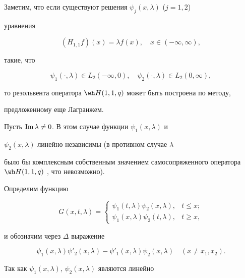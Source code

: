  


Заметим, что если существуют решения $\psi_j(x,\lambda)$ ($j=1,2$) 


уравнения 


$$ 


(H_{1,1}f)(x)=\lambda f(x),\quad x\in(-\infty,\infty), 


$$ 


такие, что 


$$ 


\psi_1(\cdot,\lambda)\in L_2(-\infty,0),\quad 


\psi_2(\cdot,\lambda)\in L_2(0,\infty), 


$$ 


то резольвента оператора $\wh H(1,1,q)$ может быть построена по методу, 


предложенному еще Лагранжем. 


 


Пусть $\operatorname{Im}\lambda\ne0$. В этом случае функции $\psi_1(x,\lambda)$ и 


$\psi_2(x,\lambda)$ линейно независимы (в противном случае $\lambda$ 


было бы комплексным собственным значением самосопряженного оператора $\wh 


H(1,1,q)$ \cite{2}, что невозможно). 


 


Определим функцию 


$$ 


G(x,t,\lambda)= 


\begin{cases} 


\psi_1(t,\lambda)\psi_2(x,\lambda),& t\le x; \\ 


\psi_1(x,\lambda)\psi_2(t,\lambda), & t\ge x, 


\end{cases} 


$$ 


и обозначим через $\Delta$ выражение 


$$ 


\psi_1(x,\lambda)\psi'_2(x,\lambda)-\psi'_1(x,\lambda) 


\psi_2(x,\lambda)\quad (x\ne x_1,x_2). 


$$ 


 


Так как $\psi_1(x,\lambda)$, $\psi_2(x,\lambda)$ являются линейно 


